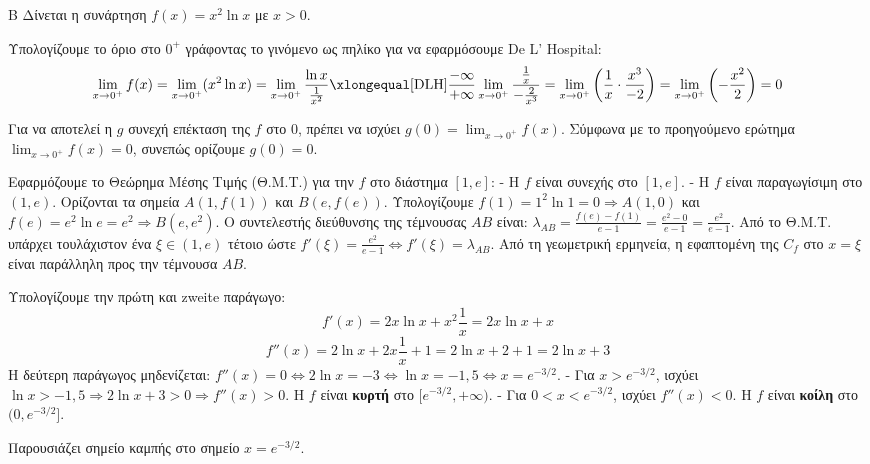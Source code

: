 \begin{thema}{Β}
Δίνεται η συνάρτηση $f(x) = x^2 \ln x$ με $x > 0$.
\begin{erwthma}
\item Υπολογίζουμε το όριο στο $0^+$ γράφοντας το γινόμενο ως πηλίκο για να εφαρμόσουμε De L' Hospital:
\[ \lim_{x\to0^+} f(x) = \lim_{x\to0^+} (x^2 \ln x) = \lim_{x\to0^+} \frac{\ln x}{\frac{1}{x^2}} \xlongequal[\text{DLH}]{\frac{-\infty}{+\infty}} \lim_{x\to0^+} \frac{\frac{1}{x}}{-\frac{2}{x^3}} = \lim_{x\to0^+} \left( \frac{1}{x} \cdot \frac{x^3}{-2} \right) = \lim_{x\to0^+} \left( -\frac{x^2}{2} \right) = 0 \]

\item Για να αποτελεί η $g$ συνεχή επέκταση της $f$ στο $0$, πρέπει να ισχύει $g(0) = \lim_{x\to0^+} f(x)$.
Σύμφωνα με το προηγούμενο ερώτημα $\lim_{x\to0^+} f(x) = 0$, συνεπώς ορίζουμε $g(0) = 0$.

\item Εφαρμόζουμε το Θεώρημα Μέσης Τιμής (Θ.Μ.Τ.) για την $f$ στο διάστημα $[1, e]$:
- Η $f$ είναι συνεχής στο $[1, e]$.
- Η $f$ είναι παραγωγίσιμη στο $(1, e)$.
Ορίζονται τα σημεία $A(1, f(1))$ και $B(e, f(e))$. 
Υπολογίζουμε $f(1) = 1^2 \ln 1 = 0 \Rightarrow A(1, 0)$ και $f(e) = e^2 \ln e = e^2 \Rightarrow B(e, e^2)$.
Ο συντελεστής διεύθυνσης της τέμνουσας $AB$ είναι: $\lambda_{AB} = \frac{f(e) - f(1)}{e - 1} = \frac{e^2 - 0}{e-1} = \frac{e^2}{e-1}$.
Από το Θ.Μ.Τ. υπάρχει τουλάχιστον ένα $\xi \in (1, e)$ τέτοιο ώστε $f'(\xi) = \frac{e^2}{e-1} \Leftrightarrow f'(\xi) = \lambda_{AB}$.
Από τη γεωμετρική ερμηνεία, η εφαπτομένη της $C_f$ στο $x=\xi$ είναι παράλληλη προς την τέμνουσα $AB$.

\item Υπολογίζουμε την πρώτη και zweite παράγωγο:
\[ f'(x) = 2x \ln x + x^2 \frac{1}{x} = 2x \ln x + x \]
\[ f''(x) = 2\ln x + 2x \frac{1}{x} + 1 = 2\ln x + 2 + 1 = 2\ln x + 3 \]
Η δεύτερη παράγωγος μηδενίζεται: $f''(x) = 0 \Leftrightarrow 2\ln x = -3 \Leftrightarrow \ln x = -1,5 \Leftrightarrow x = e^{-3/2}$.
- Για $x > e^{-3/2}$, ισχύει $\ln x > -1,5 \Rightarrow 2\ln x + 3 > 0 \Rightarrow f''(x) > 0$. Η $f$ είναι \textbf{κυρτή} στο $[e^{-3/2}, +\infty)$.
- Για $0 < x < e^{-3/2}$, ισχύει $f''(x) < 0$. Η $f$ είναι \textbf{κοίλη} στο $(0, e^{-3/2}]$.
\begin{center}
\end{center}
Παρουσιάζει σημείο καμπής στο σημείο $x = e^{-3/2}$.
\end{erwthma}
\end{thema}

